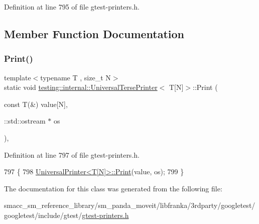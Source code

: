 Definition at line 795 of file gtest-\/printers.\+h.



\subsection{Member Function Documentation}
\mbox{\label{classtesting_1_1internal_1_1UniversalTersePrinter_3_01T[N]_4_a9e0ceb62fda7dc46ebcf5f911e459a49}} 
\subsubsection{\texorpdfstring{Print()}{Print()}}
{\footnotesize\ttfamily template$<$typename T , size\+\_\+t N$>$ \\
static void \hyperlink{classtesting_1_1internal_1_1UniversalTersePrinter}{testing\+::internal\+::\+Universal\+Terse\+Printer}$<$ T\mbox{[}N\mbox{]}$>$\+::Print (\begin{DoxyParamCaption}\item[{const T(\&)}]{value\mbox{[}\+N\mbox{]},  }\item[{\+::std\+::ostream $\ast$}]{os }\end{DoxyParamCaption})\hspace{0.3cm}{\ttfamily [inline]}, {\ttfamily [static]}}



Definition at line 797 of file gtest-\/printers.\+h.


\begin{DoxyCode}
797                                                          \{
798     \hyperlink{classtesting_1_1internal_1_1UniversalPrinter_aecec021e1abbaa260b701e24e3fe33eb}{UniversalPrinter<T[N]>::Print}(value, os);
799   \}
\end{DoxyCode}


The documentation for this class was generated from the following file\+:\begin{DoxyCompactItemize}
\item 
smacc\+\_\+sm\+\_\+reference\+\_\+library/sm\+\_\+panda\+\_\+moveit/libfranka/3rdparty/googletest/googletest/include/gtest/\hyperlink{gtest-printers_8h}{gtest-\/printers.\+h}\end{DoxyCompactItemize}
